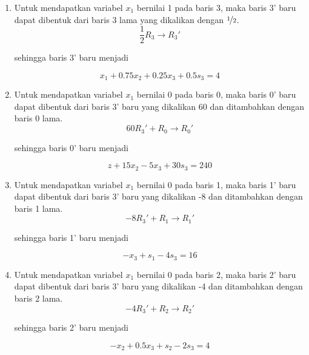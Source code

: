 \begin{enumerate}
	\item Untuk mendapatkan variabel \(x_1\) bernilai 1 pada baris 3, maka baris 3' baru dapat dibentuk dari baris 3 lama yang dikalikan dengan \(\nicefrac{1}{2}\).\\

	\begin{equation*}
		\frac{1}{2}R_3 \rightarrow R_3'
	\end{equation*}

	sehingga baris 3' baru menjadi

	\begin{equation*}
		x_1 + 0.75x_2 + 0.25x_3 + 0.5s_3 = 4
	\end{equation*}
	
	\item Untuk mendapatkan variabel \(x_1\) bernilai 0 pada baris 0, maka baris 0' baru dapat dibentuk dari baris 3' baru yang dikalikan 60 dan ditambahkan dengan baris 0 lama.\\

	\begin{equation*}
		60R_3' + R_0 \rightarrow R_0'
	\end{equation*}

	sehingga baris 0' baru menjadi

	\begin{equation*}
		z + 15x_2 - 5x_3 + 30s_3 = 240
	\end{equation*}

	\item Untuk mendapatkan variabel \(x_1\) bernilai 0 pada baris 1, maka baris 1' baru dapat dibentuk dari baris 3' baru yang dikalikan -8 dan ditambahkan dengan baris 1 lama.\\

	\begin{equation*}
		-8R_3' + R_1 \rightarrow R_1'
	\end{equation*}

	sehingga baris 1' baru menjadi

	\begin{equation*}
		-x_3 + s_1 - 4s_3 = 16
	\end{equation*}

	\item Untuk mendapatkan variabel \(x_1\) bernilai 0 pada baris 2, maka baris 2' baru dapat dibentuk dari baris 3' baru yang dikalikan -4 dan ditambahkan dengan baris 2 lama.\\

	\begin{equation*}
		-4R_3' + R_2 \rightarrow R_2'
	\end{equation*}

	sehingga baris 2' baru menjadi

	\begin{equation*}
		-x_2 + 0.5x_3 + s_2 - 2s_3 = 4
	\end{equation*}

\end{enumerate}


